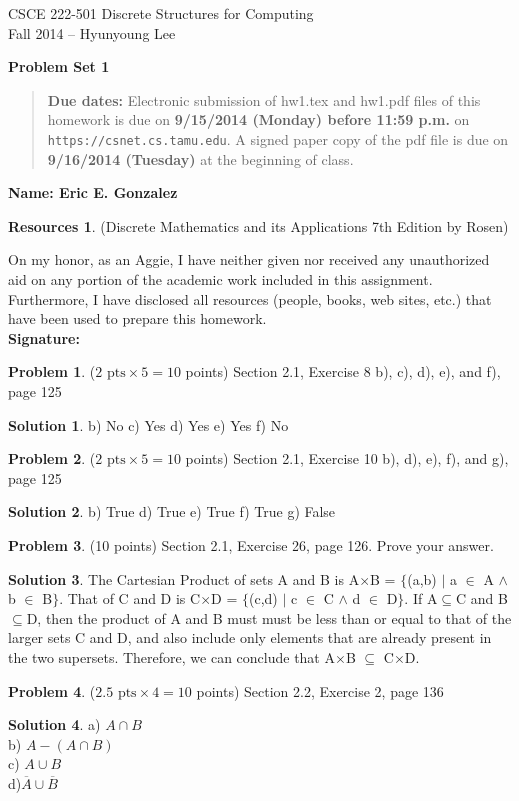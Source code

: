 \documentclass{article}
\theoremstyle{definition}
\newtheorem{problem}{Problem}
\newtheorem*{solution}{Solution}
\newtheorem*{resources}{Resources}
\newcommand{\name}[1]{\noindent\textbf{Name: Eric E. Gonzalez}}
\newcommand{\honor}{\noindent On my honor, as an Aggie, I have neither
  given nor received any unauthorized aid on any portion of the
  academic work included in this assignment. Furthermore, I have
  disclosed all resources (people, books, web sites, etc.) that have
  been used to prepare this homework. \\[2ex]
 \textbf{Signature:} \underline{\hspace*{7cm}} }
\newcommand{\problemset}[1]{\begin{center}\textbf{Problem Set #1}\end{center}}
\newcommand{\duedate}[2]{\begin{quote}\textbf{Due dates:} Electronic
    submission of hw1.tex and hw1.pdf files of this homework is due on
    \textbf{#1} on \texttt{https://csnet.cs.tamu.edu}.  A signed paper copy of the pdf file is due on
    \textbf{#2} at the beginning of class.\end{quote} }
\begin{document}
\begin{center}
{\large
CSCE 222-501 Discrete Structures for Computing\\[.5ex]
Fall 2014 -- Hyunyoung Lee\\}
\end{center}
\problemset{1}
\duedate{9/15/2014 (Monday) before 11:59 p.m.}{9/16/2014 (Tuesday)}
\name{ (type your name here) }
\begin{resources} (Discrete Mathematics and its Applications 7th Edition by Rosen)
\end{resources}
\honor

\bigskip

\begin{problem} ($2 \mbox{ pts} \times 5 = 10$ points)
Section 2.1, Exercise 8 b), c), d), e), and f), page 125
\end{problem}
\begin{solution} 
b) No c) Yes d) Yes e) Yes f) No
\end{solution}

\begin{problem} ($2 \mbox{ pts} \times 5 = 10$ points)
Section 2.1, Exercise 10 b), d), e), f), and g), page 125
\end{problem}
\begin{solution} 
b) True d) True e) True f) True g) False
\end{solution}

\begin{problem} (10 points)
Section 2.1, Exercise 26, page 126. Prove your answer. 
\end{problem}
\begin{solution} 
The Cartesian Product of sets A and B is A$\times$B = $\{$(a,b) $\mid$ a $\in$ A $\wedge$ b $\in$ B$\}$. That of C and D is C$\times$D = $\{$(c,d) $\mid$ c $\in$ C $\wedge$ d $\in$ D$\}$. If A$\subseteq$C and B$\subseteq$D, then the product of A and B must must be less than or equal to that of the larger sets C and D, and also include only elements that are already present in the two supersets. Therefore, we can conclude that A$\times$B $\subseteq$ C$\times$D.
\end{solution}

\begin{problem} ($2.5 \mbox{ pts} \times 4 = 10$ points)
Section 2.2, Exercise 2, page 136
\end{problem}
\begin{solution} 
a) $A \cap B$
\\b) $A - (A \cap B)$
\\c) $A \cup B$
\\d)$\overline{A} \cup \overline{B}$
\end{solution}
\end{document}
